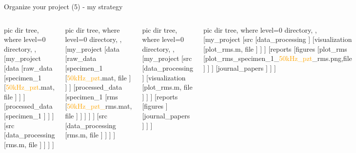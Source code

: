 \documentclass[10pt,aspectratio=169,notes]{beamer} %
\begin{document}
\begin{frame}[t,label=frame13]{Organize your project (5) - my strategy}
\vspace{-5mm}
\begin{columns}[T]
	\centering
	{
	\begin{forest}
		pic dir tree,
		where level=0{}{%
			directory,
		},
		[my\_project
		[data
		[raw\_data
			[specimen\_1
				[\textcolor{orange}{50kHz\_pzt}.mat, file
				]
			]
		]
		[processed\_data
			[specimen\_1
			]
		]
		]
		[src
			[data\_processing
				[\alert{rms}.m, file
				]
			]
		]
		]
	\end{forest}
	}
	{
		\begin{forest}
			pic dir tree,
			where level=0{}{%
				directory,
			},
			[my\_project
			[data
			[raw\_data
				[specimen\_1
					[\textcolor{orange}{50kHz\_pzt}.mat, file
					]
				]
			]
			[processed\_data
				[specimen\_1
					[\alert{rms}
						[\textcolor{orange}{50kHz\_pzt\_}\alert{rms}.mat, file
						]
					]
				]
			]
			]
			[src
				[data\_processing
					[\alert{rms}.m, file
					]
				]
			]
			]
		\end{forest}
	}
	\centering
	{
	\begin{forest}
		pic dir tree,
		where level=0{}{%
			directory,
		},
		[my\_project
		[src
			[data\_processing
			]
			[visualization
				[\textcolor{logoblue}{plot\_rms}.m, file
				]
			]
		]
		[reports
			[figures
			]
			[journal\_papers
			]
		]
		]
	\end{forest}
	}
	{
	\begin{forest}
		pic dir tree,
		where level=0{}{%
			directory,
		},
		[my\_project
		[src
			[data\_processing
			]
			[visualization
				[\textcolor{logoblue}{plot\_rms}.m, file
				]
			]
		]
		[reports
			[figures
				[\textcolor{logoblue}{plot\_rms}
					[\textcolor{logoblue}{plot\_rms}\_specimen\_1\_\textcolor{orange}{50kHz\_pzt}\_\alert{rms}.png,file
					]
				]
			]
			[journal\_papers
			]
		]
		]
	\end{forest}
	}
\end{columns}	
\end{frame}
\end{document}
